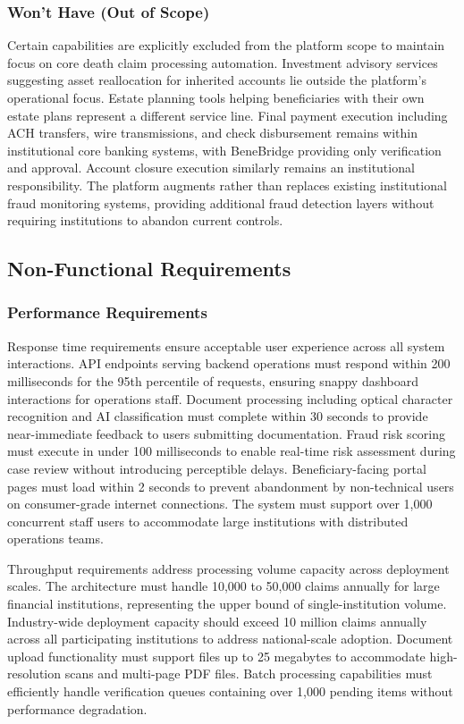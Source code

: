 \subsubsection{Won't Have (Out of Scope)}

Certain capabilities are explicitly excluded from the platform scope to maintain focus on core death claim processing automation. Investment advisory services suggesting asset reallocation for inherited accounts lie outside the platform's operational focus. Estate planning tools helping beneficiaries with their own estate plans represent a different service line. Final payment execution including ACH transfers, wire transmissions, and check disbursement remains within institutional core banking systems, with BeneBridge providing only verification and approval. Account closure execution similarly remains an institutional responsibility. The platform augments rather than replaces existing institutional fraud monitoring systems, providing additional fraud detection layers without requiring institutions to abandon current controls.

\subsection{Non-Functional Requirements}

\subsubsection{Performance Requirements}

Response time requirements ensure acceptable user experience across all system interactions. API endpoints serving backend operations must respond within 200 milliseconds for the 95th percentile of requests, ensuring snappy dashboard interactions for operations staff. Document processing including optical character recognition and AI classification must complete within 30 seconds to provide near-immediate feedback to users submitting documentation. Fraud risk scoring must execute in under 100 milliseconds to enable real-time risk assessment during case review without introducing perceptible delays. Beneficiary-facing portal pages must load within 2 seconds to prevent abandonment by non-technical users on consumer-grade internet connections. The system must support over 1,000 concurrent staff users to accommodate large institutions with distributed operations teams.

Throughput requirements address processing volume capacity across deployment scales. The architecture must handle 10,000 to 50,000 claims annually for large financial institutions, representing the upper bound of single-institution volume. Industry-wide deployment capacity should exceed 10 million claims annually across all participating institutions to address national-scale adoption. Document upload functionality must support files up to 25 megabytes to accommodate high-resolution scans and multi-page PDF files. Batch processing capabilities must efficiently handle verification queues containing over 1,000 pending items without performance degradation.

